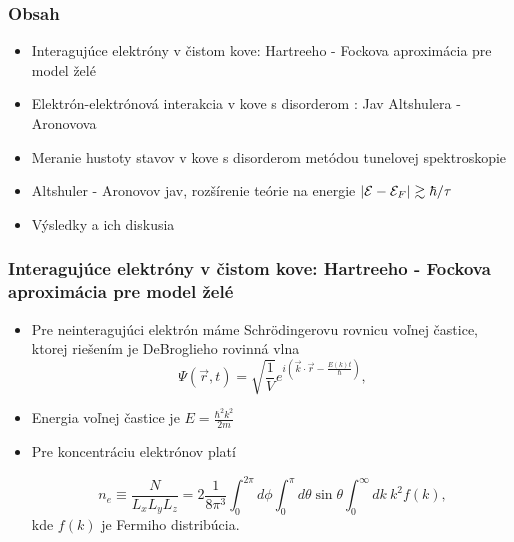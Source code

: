\documentclass[
	11pt, %
]{beamer}
\begin{document}
\begin{frame}
	\frametitle{Obsah} %
	\begin{itemize}
	\item Interagujúce elektróny v čistom kove: Hartreeho - Fockova aproximácia pre model želé
	\item Elektrón-elektrónová interakcia v kove s disorderom : Jav Altshulera - Aronovova
	\item Meranie hustoty stavov v kove s disorderom metódou tunelovej spektroskopie
	\item Altshuler - Aronovov jav, rozšírenie teórie na energie $|\mathcal{E} - \mathcal{E}_F| \gtrsim \hbar/\tau$
	\item Výsledky a ich diskusia
	\end{itemize}
\end{frame}
\begin{frame}


\frametitle{Interagujúce elektróny v čistom kove: Hartreeho - Fockova aproximácia pre model želé}
\begin{itemize}
\item Pre neinteragujúci elektrón máme Schr\"odingerovu rovnicu voľnej častice,
ktorej riešením je DeBroglieho rovinná vlna
\begin{equation}
\label{eq:fp}
 \Psi(\vec r,t)=\sqrt{\frac{1}{V}}e^{i(\vec k\cdot\vec r-\frac{E(k)t}{\hbar})} \text{,}
\end{equation}
\item Energia voľnej častice je $E=\frac{\hbar^2k^2}{2m}$
\item Pre koncentráciu  elektrónov platí

\begin{equation}
 \label{eq:N integral sfercky}
 n_e \equiv \frac{N}{L_xL_yL_z} = 2 \frac{1}{8\pi^3} \int_0^{2\pi} d\phi \int_0^{\pi}  d\theta \sin{\theta} \int_0^{\infty} dk\ k^2 f(k)  \text{,}
\end{equation}
kde $f(k)$ je Fermiho distribúcia.
\end{itemize}
\end{frame}
\end{document}
